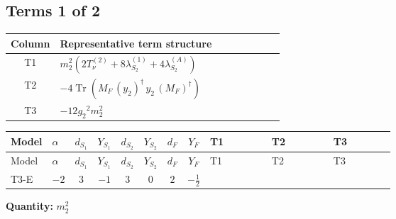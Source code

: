 \documentclass[8pt]{article}
\begin{document}
\begin{landscape}
\subsection*{Terms 1 of 2}
\begin{center}
\begin{tabular}{@{}c >{\raggedright\arraybackslash}p{0.82\linewidth}@{}}
\toprule
Column & Representative term structure \\
\midrule
T1 & \(\displaystyle {m_2^2} (2 T_{\nu}^{(2)}+8 {\lambda_{S_2}^{(1)}}+4 {\lambda_{S_2}^{(A)}})\) \\
\midrule
T2 & \(\displaystyle -4 \operatorname{Tr}\!\left({M_F}\,\left({y_2}\right)^{\dagger}\,{y_2}\,\left({M_F}\right)^{\dagger}\right)\) \\
\midrule
T3 & \(\displaystyle -12 {g_2}^2 {m_2^2}\) \\
\midrule
\bottomrule
\end{tabular}
\end{center}
\smallskip
\tiny
\begin{longtable}{@{}llcccccc >{\raggedright\arraybackslash}p{0.21\linewidth} >{\raggedright\arraybackslash}p{0.21\linewidth} >{\raggedright\arraybackslash}p{0.21\linewidth}@{}}
\toprule
Model & $\alpha$ & $d_{S_1}$ & $Y_{S_1}$ & $d_{S_2}$ & $Y_{S_2}$ & $d_F$ & $Y_F$ & T1 & T2 & T3 \\
\midrule
\endfirsthead
\toprule
Model & $\alpha$ & $d_{S_1}$ & $Y_{S_1}$ & $d_{S_2}$ & $Y_{S_2}$ & $d_F$ & $Y_F$ & T1 & T2 & T3 \\
\midrule
\endhead
T3-E & $-2$ & $3$ & $-1$ & $3$ & $0$ & $2$ & $-\frac{1}{2}$ & \scriptsize\adjustbox{max width=\linewidth}{$\begin{gathered} {m_2^2} (2 T_{\nu}^{(2)}+8 {\lambda_{S_2}^{(1)}}+4 {\lambda_{S_2}^{(A)}})\end{gathered}$} & \scriptsize\adjustbox{max width=\linewidth}{$\begin{gathered} -4 \operatorname{Tr}\!\left({M_F}\,\left({y_2}\right)^{\dagger}\,{y_2}\,\left({M_F}\right)^{\dagger}\right)\end{gathered}$} & \scriptsize\adjustbox{max width=\linewidth}{$\begin{gathered} -12 {g_2}^2 {m_2^2}\end{gathered}$} \\
\midrule
\bottomrule
\end{longtable}
\clearpage
\noindent\textbf{Quantity: }$m_2^2$\par\smallskip

\end{landscape}
\end{document}
